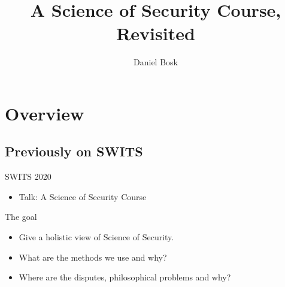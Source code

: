 \title{%
  A Science of Security Course, Revisited
}
\author{Daniel Bosk}


\mode*

\begin{abstract}
  
\end{abstract}


\section{Overview}

\subsection{Previously on SWITS}

\begin{frame}
  \begin{block}{SWITS 2020}
    \begin{itemize}
      \item Talk: A Science of Security Course
    \end{itemize}
  \end{block}

  \pause

  \begin{block}{The goal}
    \begin{itemize}
      \item Give a holistic view of Science of Security.
      \item What are the methods we use and why?
      \item Where are the disputes, philosophical problems and why?
    \end{itemize}
  \end{block}
\end{frame}

\begin{frame}
\end{frame}

